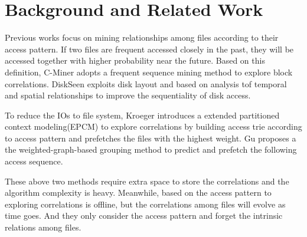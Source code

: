 \section{Background and Related Work}

Previous works focus on mining relationships among files according to their access pattern. If two files are frequent accessed closely in the past, they will be accessed together with higher probability near the future. Based on this definition, C-Miner\cite{li2004c} adopts a frequent sequence mining method to explore block correlations. DiskSeen\cite{ding2007diskseen} exploits disk layout and based on analysis tof temporal and spatial relationships to improve the sequentiality of disk access. 

To reduce the IOs to file system, Kroeger\cite{kroeger2001design} introduces a extended partitioned context modeling(EPCM) to explore correlations by building access trie according to access pattern and prefetches the files with the highest weight. Gu\cite{gu2010novel} proposes a the weighted-graph-based grouping method to predict and prefetch the following access sequence.

These above two methods require extra space to store the correlations and the algorithm complexity is heavy. Meanwhile, based on the access pattern to exploring correlations is offline, but the correlations among files will evolve as time goes. And they only consider the access pattern and forget the intrinsic relations among files. 